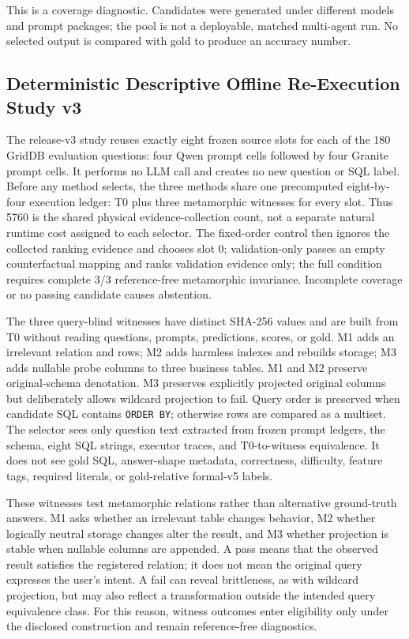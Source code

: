 \documentclass[applsci,article,submit,moreauthors]{Definitions/mdpi}
\begin{document}
This is a coverage diagnostic. Candidates were generated under different models and prompt packages; the pool is not a deployable, matched multi-agent run. No selected output is compared with gold to produce an accuracy number.

\subsection{Deterministic Descriptive Offline Re-Execution Study v3}

The release-v3 study reuses exactly eight frozen source slots for each of the 180 GridDB evaluation questions: four Qwen prompt cells followed by four Granite prompt cells. It performs no LLM call and creates no new question or SQL label. Before any method selects, the three methods share one precomputed eight-by-four execution ledger: T0 plus three metamorphic witnesses for every slot. Thus 5760 is the shared physical evidence-collection count, not a separate natural runtime cost assigned to each selector. The fixed-order control then ignores the collected ranking evidence and chooses slot 0; validation-only passes an empty counterfactual mapping and ranks validation evidence only; the full condition requires complete 3/3 reference-free metamorphic invariance. Incomplete coverage or no passing candidate causes abstention.

The three query-blind witnesses have distinct SHA-256 values and are built from T0 without reading questions, prompts, predictions, scores, or gold. M1 adds an irrelevant relation and rows; M2 adds harmless indexes and rebuilds storage; M3 adds nullable probe columns to three business tables. M1 and M2 preserve original-schema denotation. M3 preserves explicitly projected original columns but deliberately allows wildcard projection to fail. Query order is preserved when candidate SQL contains \texttt{ORDER BY}; otherwise rows are compared as a multiset. The selector sees only question text extracted from frozen prompt ledgers, the schema, eight SQL strings, executor traces, and T0-to-witness equivalence. It does not see gold SQL, answer-shape metadata, correctness, difficulty, feature tags, required literals, or gold-relative formal-v5 labels.

These witnesses test metamorphic relations rather than alternative ground-truth answers. M1 asks whether an irrelevant table changes behavior, M2 whether logically neutral storage changes alter the result, and M3 whether projection is stable when nullable columns are appended. A pass means that the observed result satisfies the registered relation; it does not mean the original query expresses the user's intent. A fail can reveal brittleness, as with wildcard projection, but may also reflect a transformation outside the intended query equivalence class. For this reason, witness outcomes enter eligibility only under the disclosed construction and remain reference-free diagnostics.
\end{document}
